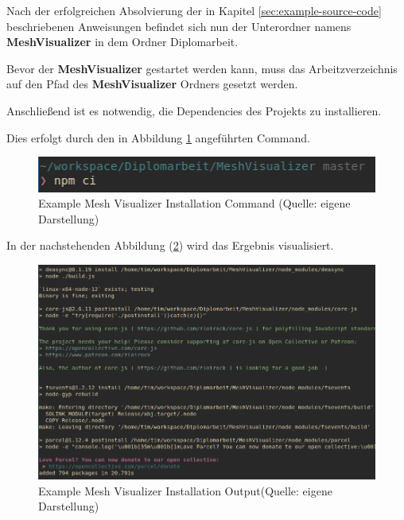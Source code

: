 Nach der erfolgreichen Absolvierung der in Kapitel \ref{sec:example-source-code} beschriebenen Anweisungen befindet sich nun der Unterordner namens \textbf{MeshVisualizer} in dem Ordner Diplomarbeit.

Bevor der \textbf{MeshVisualizer} gestartet werden kann, muss das Arbeitzverzeichnis auf den Pfad des \textbf{MeshVisualizer} Ordners gesetzt werden.

Anschließend ist es notwendig, die Dependencies des Projekts zu installieren.

Dies erfolgt durch den in Abbildung \ref{abb:example_mesh_visualizer_installation_cmd} angeführten Command.

\begin{figure}[H]
    \begin{center}
        \includegraphics[scale=1]{images/example_mesh_visualizer_installation_cmd.png}
        \caption{Example Mesh Visualizer Installation Command (Quelle: eigene Darstellung)}
        \label{abb:example_mesh_visualizer_installation_cmd}
    \end{center}
\end{figure}

\pagebreak
In der nachstehenden Abbildung (\ref{abb:example_mesh_visualizer_installation_output}) wird das Ergebnis visualisiert.

\begin{figure}[H]
    \begin{center}
        \includegraphics[scale=.6]{images/example_mesh_visualizer_installation_output.png}
        \caption{Example Mesh Visualizer Installation Output(Quelle: eigene Darstellung)}
        \label{abb:example_mesh_visualizer_installation_output}
    \end{center}
\end{figure}

